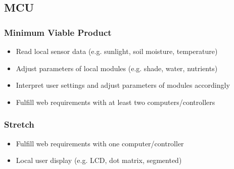 \subsection{MCU}
\subsubsection{Minimum Viable Product}
\begin{itemize}
    \item Read local sensor data (e.g. sunlight, soil moisture, temperature)
    \item Adjust parameters of local modules (e.g. shade, water, nutrients)
    \item Interpret user settings and adjust parameters of modules accordingly
    \item Fulfill web requirements with at least two computers/controllers
\end{itemize}
\subsubsection{Stretch}
\begin{itemize}
    \item Fulfill web requirements with one computer/controller
    \item Local user display (e.g. LCD, dot matrix, segmented)
\end{itemize}